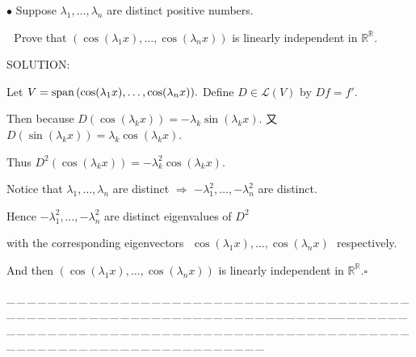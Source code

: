 \documentclass[a4paper, 11pt, UTF8]{article}
\def\Spn{\textup{span}\,}
\def\Lm{\mathcal{L}}
\def\Rbb{\mathbb{R}}
\begin{document}
\begin{large}
{\small $\bullet$} {\timessl\Large 
Suppose $\lambda_1,\dots,\lambda_n$ are distinct positive numbers. }\par\,\,
{\timessl\Large Prove that $(\cos(\lambda_1 x),\dots,\cos(\lambda_n x))$ is linearly independent in $\Rbb^\Rbb.$
}\par
{\timesbf S\footnotesize{OLUTION:}}\par\quad
Let $V=\Spn(\cos(\lambda_1 x),\dots,\cos(\lambda_n x)).$ Define $D\in\Lm(V)$ by $Df=f'.$\par\quad
Then because $D(\cos(\lambda_k x))=-\lambda_k\sin(\lambda_k x).$ 又 $D(\sin(\lambda_k x))=\lambda_k\cos(\lambda_k x).$\par\quad
Thus $D^2(\cos(\lambda_k x))=-\lambda_k^2\cos(\lambda_k x).$\par\quad
Notice that $\lambda_1,\dots,\lambda_n$ are distinct $\Rightarrow$ $-\lambda_1^2,\dots,-\lambda_n^2$ are distinct.\par\quad
Hence $-\lambda_1^2,\dots,-\lambda_n^2$ are distinct eigenvalues of $D^2$\par\qquad\qquad\quad
with the corresponding eigenvectors \,\,$\cos(\lambda_1 x),\dots,\cos(\lambda_n x)$\,\, respectively.\par\quad
And then $(\cos(\lambda_1 x),\dots,\cos(\lambda_n x))$ is linearly independent in $\Rbb^\Rbb$.\quad$\square$\par
{\tiny \_\,\_\,\_\,\_\,\_\,\_\,\_\,\_\,\_\,\_\,\_\,\_\,\_\,\_\,\_\,\_\,\_\,\_\,\_\,\_\,\_\,\_\,\_\,\_\,\_\,\_\,\_\,\_\,\_\,\_\,\_\,\_\,\_\,\_\,\_\,\_\,\_\,\_\,\_\,\_\,\_\,\_\,\_\,\_\,\_\,\_\,\_\,\_\,\_\,\_\,\_\,\_\,\_\,\_\,\_\,\_\,\_\,\_\,\_\,\_\,\_\,\_\,\_\,\_\,\_\,\_\,\_\,\_\,\_\,\_\,\_\_\,\_\,\_\,\_\,\_\,\_\,\_\,\_\,\_\,\_\,\_\,\_\,\_\,\_\,\_\,\_\,\_\,\_\,\_\,\_\,\_\,\_\,\_\,\_\,\_\,\_\,\_\,\_\,\_\,\_\,\_\,\_\,\_\,\_\,\_\,\_\,\_\,\_\,\_\,\_\,\_\,\_\,\_\,\_\,\_\,\_\,\_\,\_\,\_\,\_\,\_\,\_\,\_\,\_\,\_\,\_\,\_\,\_\,\_\,\_\,\_\,\_\,\_\,\_\,\_\,\_\,\_\,\_\,\_\,\_\,\_}\par



\end{large}
\end{document}
